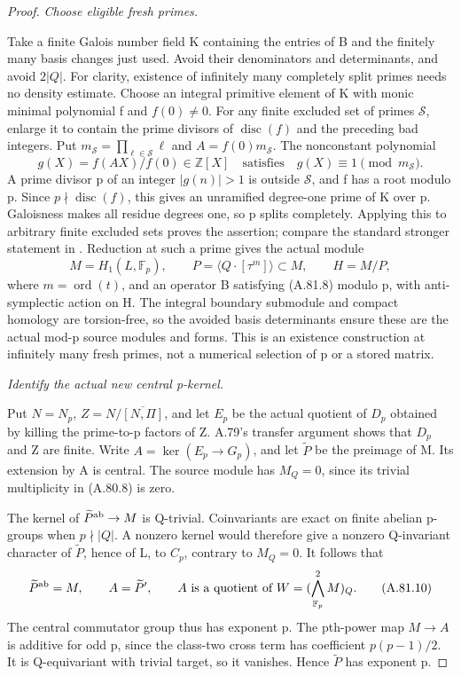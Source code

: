 \begin{proof}
\emph{Choose eligible fresh primes.}\par
Take a finite Galois number field K containing the entries
of B and the finitely many basis changes just used. Avoid
their denominators and determinants, and avoid \(2|Q|\).
For clarity, existence of infinitely many completely split
primes needs no density estimate. Choose an integral
primitive element of K with monic minimal polynomial f
and \(f(0)\ne0\). For any finite excluded set of primes
\(\mathcal S\), enlarge it to contain the prime divisors
of \(\operatorname{disc}(f)\) and the preceding bad
integers. Put \(m_{\mathcal S}=\prod_{\ell\in\mathcal S}\ell\)
and \(A=f(0)m_{\mathcal S}\). The nonconstant polynomial
\[
                 g(X)=f(AX)/f(0)\in\mathbb Z[X]
                 \quad\text{satisfies}\quad
                 g(X)\equiv1\pmod{m_{\mathcal S}}.
\]
A prime divisor p of an integer \(|g(n)|>1\) is outside
\(\mathcal S\), and f has a root modulo p. Since
\(p\nmid\operatorname{disc}(f)\), this gives an unramified
degree-one prime of K over p. Galoisness makes all residue
degrees one, so p splits completely. Applying this to
arbitrary finite excluded sets proves the assertion;
compare the standard stronger statement in
\citet[Theorem~8.31 and Corollary~8.32]{AMilneANT2020}.
Reduction at such a prime gives the actual module
\[
 M=H_1(L,\mathbb F_p),\qquad
 P=\langle Q\cdot[\tau^m]\rangle\subset M,
 \qquad H=M/P,
 \tag{A.81.9}
\]
where \(m=\operatorname{ord}(t)\), and an operator B
satisfying (A.81.8) modulo p, with anti-symplectic
action on H. The integral boundary submodule and compact
homology are torsion-free, so the avoided basis
determinants ensure these are the actual mod-p source
modules and forms. This is an existence construction at
infinitely many fresh primes, not a numerical selection
of p or a stored matrix.

\emph{Identify the actual new central p-kernel.}\par
Put \(N=N_p\), \(Z=N/\overline{[N,\Pi]}\), and
let \(E_p\) be the actual quotient of \(D_p\) obtained
by killing the prime-to-p factors of Z. A.79's transfer
argument shows that \(D_p\) and Z are finite. Write
\(A=\ker(E_p\to G_p)\), and let \(\widetilde P\)
be the preimage of M. Its extension by A is central.
The source module has \(M_Q=0\), since its trivial
multiplicity in (A.80.8) is zero.

The kernel of \(\widetilde P^{\rm ab}\to M\) is
Q-trivial. Coinvariants are exact on finite abelian
p-groups when \(p\nmid|Q|\). A nonzero kernel would
therefore give a nonzero Q-invariant character of
\(\widetilde P\), hence of L, to \(C_p\), contrary
to \(M_Q=0\). It follows that
\[
              \widetilde P^{\rm ab}=M,
              \qquad A=\widetilde P',
              \qquad A\text{ is a quotient of }
                    W=(\bigwedge^2_{\mathbb F_p}M)_Q.
 \tag{A.81.10}
\]
The central commutator group thus has exponent p. The
pth-power map \(M\to A\) is additive for odd p,
since the class-two cross term has coefficient
\(p(p-1)/2\). It is Q-equivariant with trivial target,
so it vanishes. Hence \(\widetilde P\) has exponent p.


\end{proof}
